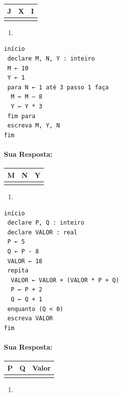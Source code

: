 \documentclass[12pt,a4paper]{article}
\providecommand{\tightlist}{%
      \setlength{\itemsep}{0pt}\setlength{\parskip}{0pt}}
\begin{document}
\begin{longtable}[]{@{}ccc@{}}
\toprule
J & X & I\tabularnewline
\midrule
\endhead
& &\tabularnewline
\bottomrule
\end{longtable}

    \begin{enumerate}
\def\labelenumi{\alph{enumi})}
\setcounter{enumi}{3}
\tightlist
\item
\end{enumerate}

\begin{verbatim}
início
 declare M, N, Y : inteiro
 M ← 10
 Y ← 1
 para N ← 1 até 3 passo 1 faça
  M ← M – 8
  Y ← Y * 3
 fim para
 escreva M, Y, N
fim 
\end{verbatim}

    \hypertarget{sua-resposta}{%
\paragraph{Sua Resposta:}\label{sua-resposta}}

\begin{longtable}[]{@{}ccc@{}}
\toprule
M & N & Y\tabularnewline
\midrule
\endhead
& &\tabularnewline
\bottomrule
\end{longtable}

    \begin{enumerate}
\def\labelenumi{\alph{enumi})}
\setcounter{enumi}{4}
\tightlist
\item
\end{enumerate}

\begin{verbatim}
início
 declare P, Q : inteiro
 declare VALOR : real
 P ← 5
 Q ← P - 8
 VALOR ← 18
 repita
  VALOR ← VALOR + (VALOR * P + Q)
  P ← P + 2
  Q ← Q + 1
 enquanto (Q < 0)
 escreva VALOR
fim 
\end{verbatim}

    \hypertarget{sua-resposta}{%
\paragraph{Sua Resposta:}\label{sua-resposta}}

\begin{longtable}[]{@{}ccc@{}}
\toprule
P & Q & Valor\tabularnewline
\midrule
\endhead
& &\tabularnewline
\bottomrule
\end{longtable}

    \begin{enumerate}
\def\labelenumi{\alph{enumi})}
\setcounter{enumi}{5}
\tightlist
\item
\end{enumerate}
\end{document}
